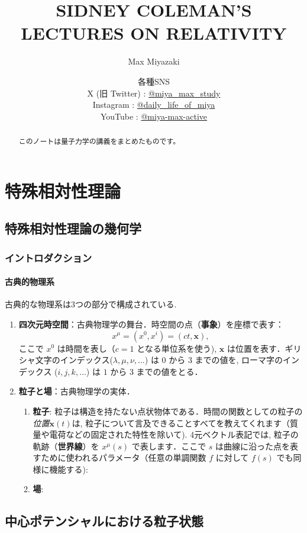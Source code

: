 \documentclass[12pt]{jsbook}
\title{ SIDNEY COLEMAN'S LECTURES ON RELATIVITY}
\date{各種SNS\\
    X (旧 Twitter) : \href{https://x.com/miya_max_study}{@miya\_max\_study}\\
    Instagram : \href{https://www.instagram.com/daily_life_of_miya/}{@daily\_life\_of\_miya}\\
    YouTube : \href{https://www.youtube.com/@miya-max-active}{@miya-max-active}
    }
\author{Max Miyazaki}
\numberwithin{equation}{section}
\begin{document}
\maketitle
\vspace{1cm}
\begin{abstract}
    このノートは量子力学の講義をまとめたものです。
\end{abstract}

\newpage
\tableofcontents
\newpage
\part{特殊相対性理論}
\chapter{特殊相対性理論の幾何学}
\section{イントロダクション}
\subsection{古典的物理系}
古典的な物理系は3つの部分で構成されている. 
\begin{enumerate}
    \item \textbf{四次元時空間}：古典物理学の舞台．時空間の点（\textbf{事象}）を座標で表す：
    \begin{equation*}
    x^{\mu} = (x^0, x^i) = (ct, \mathbf{x}), \tag{1.1}
    \end{equation*}
    ここで $x^0$ は時間を表し（$c = 1$ となる単位系を使う), $\mathbf{x}$ は位置を表す．ギリシャ文字のインデックス($\lambda, \mu, \nu, \ldots$) は $0$ から $3$ までの値を, ローマ字のインデックス ($i, j, k, \ldots$) は $1$ から $3$ までの値をとる．
    
    \item \textbf{粒子と場}：古典物理学の実体．
    
    \begin{enumerate}
    \item \textbf{粒子}: 粒子は構造を持たない点状物体である．時間の関数としての粒子の\textit{位置}$\mathbf{x}(t)$は, 粒子について言及できることすべてを教えてくれます（質量や電荷などの固定された特性を除いて). 4元ベクトル表記では, 粒子の軌跡（\textbf{世界線}）を $x^{\mu}(s)$ で表します．ここで $s$ は曲線に沿った点を表すために使われるパラメータ（任意の単調関数 $f$ に対して $f(s)$ でも同様に機能する):
    \item \textbf{場}:
    \end{enumerate}
    \end{enumerate}

\chapter{中心ポテンシャルにおける粒子状態}
\end{document}
